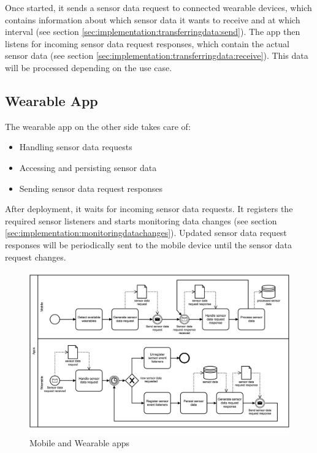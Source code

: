 Once started, it sends a sensor data request to connected wearable devices, which contains information about which sensor data it wants to receive and at which interval (see section \ref{sec:implementation:transferringdata:send}).
The app then listens for incoming sensor data request responses, which contain the actual sensor data (see section \ref{sec:implementation:transferringdata:receive}).
This data will be processed depending on the use case.

\subsection{Wearable App}
\label{sec:concept:wearableapp}
The wearable app on the other side takes care of:
\begin{itemize}[noitemsep]
	\item Handling sensor data requests
	\item Accessing and persisting sensor data
	\item Sending sensor data request responses
\end{itemize}

After deployment, it waits for incoming sensor data requests.
It registers the required sensor listeners and starts monitoring data changes (see section \ref{sec:implementation:monitoringdatachanges}).
Updated sensor data request responses will be periodically sent to the mobile device until the sensor data request changes.


\begin{figure}[H]
	\includegraphics[width=\linewidth]{diagrams/apps.png}
	\caption[Caption for apps]{Mobile and Wearable apps}
	\label{fig:apps}
\end{figure}

\clearpage